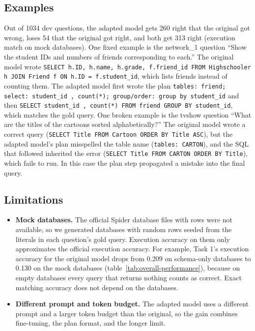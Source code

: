 \subsection{Examples}
\label{sec:rq3-examples}

Out of 1034 dev questions, the adapted model gets 260 right that the original got wrong, loses 54 that the original got right, and both get 313 right (execution match on mock databases). One fixed example is the network\_1 question ``Show the student IDs and numbers of friends corresponding to each.'' The original model wrote \texttt{SELECT h.ID, h.name, h.grade, f.friend\_id FROM Highschooler h JOIN Friend f ON h.ID = f.student\_id}, which lists friends instead of counting them. The adapted model first wrote the plan \texttt{tables: friend; select: student\_id , count(*); group/order: group by student\_id} and then \texttt{SELECT student\_id , count(*) FROM friend GROUP BY student\_id}, which matches the gold query. One broken example is the tvshow question ``What are the titles of the cartoons sorted alphabetically?'' The original model wrote a correct query (\texttt{SELECT Title FROM Cartoon ORDER BY Title ASC}), but the adapted model's plan misspelled the table name (\texttt{tables: CARTON}), and the SQL that followed inherited the error (\texttt{SELECT Title FROM CARTON ORDER BY Title}), which fails to run. In this case the plan step propagated a mistake into the final query.

\subsection{Limitations}
\label{sec:rq3-limitations}

\begin{itemize}
\item \textbf{Mock databases.} The official Spider database files with rows were not available, so we generated databases with random rows seeded from the literals in each question's gold query. Execution accuracy on them only approximates the official execution accuracy. For example, Task 1's execution accuracy for the original model drops from 0.209 on schema-only databases to 0.130 on the mock databases (table~\ref{tab:overall-performance}), because on empty databases every query that returns nothing counts as correct. Exact matching accuracy does not depend on the databases.
\item \textbf{Different prompt and token budget.} The adapted model uses a different prompt and a larger token budget than the original, so the gain combines fine-tuning, the plan format, and the longer limit.
\end{itemize}


